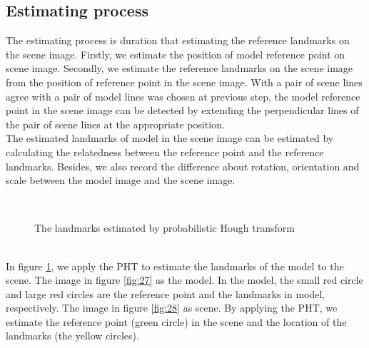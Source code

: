 \subsection{Estimating process}
The estimating process is duration that estimating the reference landmarks on the scene image. Firstly, we estimate the position of model reference point on scene image. Secondly, we estimate the reference landmarks on the scene image from the position of reference point in the scene image. With a pair of scene lines agree with a pair of model lines was chosen at previous step, the model reference point in the scene image can be detected by extending the perpendicular lines of the pair of scene lines at the appropriate position.\\[0.2cm]
The estimated landmarks of model in the scene image can be estimated by calculating the relatedness between the reference point and the reference landmarks. Besides, we also record the difference about rotation, orientation and scale between the model image and the scene image.
\begin{figure}[h!]
\centering
{}~~
\caption{The landmarks estimated by probabilistic Hough transform}
\label{fig:42}
\end{figure}~\\
In figure \ref{fig:42}, we apply the PHT to estimate the landmarks of the model to the scene. The image in figure \ref{fig:27} as the model. In the model, the small red circle and large red circles are the reference point and the landmarks in model, respectively. The image in figure \ref{fig:28} as scene. By applying the PHT, we estimate the reference point (green circle) in the scene and the location of the landmarks (the yellow circles).
